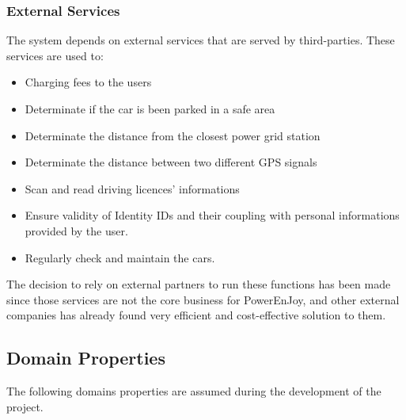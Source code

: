 \documentclass[11pt]{article} %
\newcommand{\pecomma}{PowerEnJoy, }
\begin{document}
  \subsubsection{External Services}
 The system depends on external services that are served by third-parties. These services are used to:
  \begin{itemize}
  	\item Charging fees to the users
  	\item Determinate if the car is been parked in a safe area
  	\item Determinate the distance from the closest power grid station
  	\item Determinate the distance between two different GPS signals
	\item Scan and read driving licences' informations
	\item Ensure validity of Identity IDs and their coupling with personal informations provided by the user.
	\item Regularly check and maintain the cars.
  \end{itemize}
  	
 The decision to rely on external partners to run these functions has been made since those services are not the core business for \pecomma and other external companies has already found very efficient and cost-effective solution to them.

\subsection{Domain Properties}

The following domains properties are assumed during the development of the project.
\end{document}
